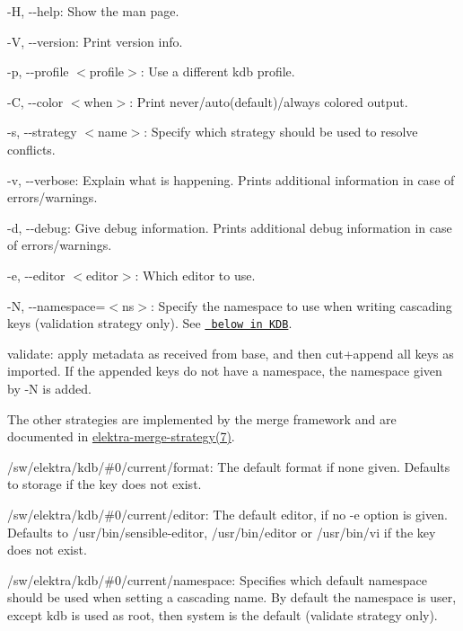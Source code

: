 \begin{DoxyItemize}
\item {\ttfamily -\/H}, {\ttfamily -\/-\/help}\+: Show the man page.
\item {\ttfamily -\/V}, {\ttfamily -\/-\/version}\+: Print version info.
\item {\ttfamily -\/p}, {\ttfamily -\/-\/profile $<$profile$>$}\+: Use a different kdb profile.
\item {\ttfamily -\/C}, {\ttfamily -\/-\/color $<$when$>$}\+: Print never/auto(default)/always colored output.
\item {\ttfamily -\/s}, {\ttfamily -\/-\/strategy $<$name$>$}\+: Specify which strategy should be used to resolve conflicts.
\item {\ttfamily -\/v}, {\ttfamily -\/-\/verbose}\+: Explain what is happening. Prints additional information in case of errors/warnings.
\item {\ttfamily -\/d}, {\ttfamily -\/-\/debug}\+: Give debug information. Prints additional debug information in case of errors/warnings.
\item {\ttfamily -\/e}, {\ttfamily -\/-\/editor $<$editor$>$}\+: Which editor to use.
\item {\ttfamily -\/N}, {\ttfamily -\/-\/namespace}=$<$ns$>$\+: Specify the namespace to use when writing cascading keys ({\ttfamily validation} strategy only). See \href{\#KDB}{\texttt{ below in K\+DB}}.
\end{DoxyItemize}


\begin{DoxyItemize}
\item {\ttfamily validate}\+: apply metadata as received from base, and then cut+append all keys as imported. If the appended keys do not have a namespace, the namespace given by {\ttfamily -\/N} is added.
\end{DoxyItemize}

The other strategies are implemented by the merge framework and are documented in \mbox{\hyperlink{doc_help_elektra-merge-strategy_md}{elektra-\/merge-\/strategy(7)}}.


\begin{DoxyItemize}
\item {\ttfamily /sw/elektra/kdb/\#0/current/format}\+: The default format if none given. Defaults to {\ttfamily storage} if the key does not exist.
\item {\ttfamily /sw/elektra/kdb/\#0/current/editor}\+: The default editor, if no {\ttfamily -\/e} option is given. Defaults to {\ttfamily /usr/bin/sensible-\/editor}, {\ttfamily /usr/bin/editor} or {\ttfamily /usr/bin/vi} if the key does not exist.
\item {\ttfamily /sw/elektra/kdb/\#0/current/namespace}\+: Specifies which default namespace should be used when setting a cascading name. By default the namespace is user, except {\ttfamily kdb} is used as root, then {\ttfamily system} is the default ({\ttfamily validate} strategy only).
\end{DoxyItemize}

